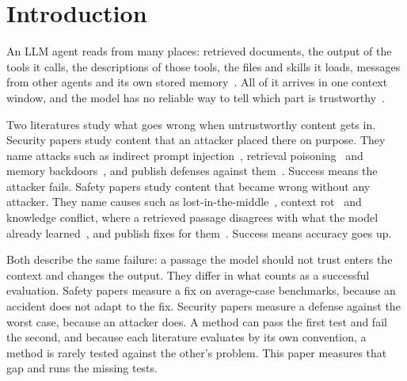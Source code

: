 \section{Introduction}

An LLM agent reads from many places: retrieved documents, the output of the
tools it calls, the descriptions of those tools, the files and skills it
loads, messages from other agents and its own stored
memory~\cite{chu-2026-systematic,ma-2025-safety}. All of it arrives in one
context window, and the model has no reliable way to tell which part is
trustworthy~\cite{greshake-2023-not}.

Two literatures study what goes wrong when untrustworthy content gets in.
Security papers study content that an attacker placed there on purpose. They
name attacks such as indirect prompt injection~\cite{greshake-2023-not},
retrieval poisoning~\cite{zou-2024-poisonedrag,zhong-2023-poisoning} and memory
backdoors~\cite{dash-2026-untrusted}, and publish defenses against
them~\cite{xiang-2024-certifiably,liu-2025-datasentinel,an-2025-ipiguard}.
Success means the attacker fails. Safety papers study content that became
wrong without any attacker. They name causes such as
lost-in-the-middle~\cite{liu-2023-lost}, context
rot~\cite{xia-2026-diagnosing} and knowledge conflict, where a retrieved
passage disagrees with what the model already learned~\cite{xie-2023-adaptive},
and publish fixes for
them~\cite{huang-2025-parammute,bi-2025-parameters,yuan-2024-discerning}.
Success means accuracy goes up.

Both describe the same failure: a passage the model should not trust enters
the context and changes the output. They differ in what counts as a
successful evaluation. Safety papers measure a fix on average-case
benchmarks, because an accident does not adapt to the fix. Security papers
measure a defense against the worst case, because an attacker does. A method
can pass the first test and fail the second, and because each literature
evaluates by its own convention, a method is rarely tested against the
other's problem. This paper measures that gap and runs the missing tests.

